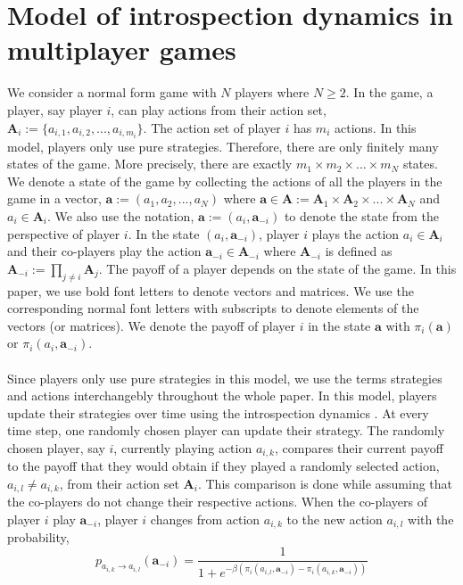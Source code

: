 \documentclass[11pt]{article}
\theoremstyle{plainCl1}
\theoremstyle{plainCl2}
\newcommand{\A}{\mathbf{A}}
\newcommand{\abf}{\mathbf{a}}
\begin{document}
\section*{Model of introspection dynamics in multiplayer games}
We consider a normal form game with $N$ players where $N \geq 2$. In the game, a player, say player $i$, can play actions from their action set, $\A_i := \{a_{i,1}, a_{i,2}, ..., a_{i,m_i} \}$. The action set of player $i$ has $m_i$ actions. In this model, players only use pure strategies. Therefore, there are only finitely many states of the game. More precisely, there are exactly $m_1 \times m_2 \times ... \times m_N$ states. We denote a state of the game by collecting the actions of all the players in the game in a vector, $\abf := (a_1, a_2, ..., a_N)$ where $\abf \in \A := \A_1 \times \A_2 \times ... \times \A_N$ and $a_i \in \A_i$. We also use the notation, $\abf := (a_i, \abf_{-i})$ to denote the state from the perspective of player $i$. In the state $(a_i, \abf_{-i})$, player $i$ plays the action $a_i \in \A_i$ and their co-players play the action $\abf_{-i} \in \A_{-i}$ where $\A_{-i}$ is defined as $\A_{-i}:= \prod_{j \neq i} \A_j$. The payoff of a player depends on the state of the game. In this paper, we use bold font letters to denote vectors and matrices. We use the corresponding normal font letters with subscripts to denote elements of the vectors (or matrices). We denote the payoff of player $i$ in the state $\abf$ with $\pi_i(\abf)$ or $\pi_i(a_i, \abf_{-i})$. \\ \\ 
\noindent Since players only use pure strategies in this model, we use the terms strategies and actions interchangebly throughout the whole paper. In this model, players update their strategies over time using the introspection dynamics \cite{Couto:NJP:2022}. At every time step, one randomly chosen player can update their strategy. The randomly chosen player, say $i$, currently playing  action $a_{i,k}$, compares their current payoff to the payoff that they would obtain if they played a randomly selected action,  $a_{i,l} \neq a_{i,k}$, from their action set $\A_i$. This comparison is done while assuming that the co-players do not change their respective actions. When the co-players of player $i$ play $\abf_{-i}$, player $i$ changes from action $a_{i,k}$ to the new action $a_{i,l}$ with the probability, \\
\begin{equation}
 p_{a_{i,k} \to a_{i,l}} (\abf_{-i})= \frac{1}{1 + e^{\displaystyle -\beta(\pi_i(a_{i,l}, \abf_{-i}) - \pi_i(a_{i,k}, \abf_{-i}))}}
 \label{Eq:introspection-update}
\end{equation}
\end{document}
